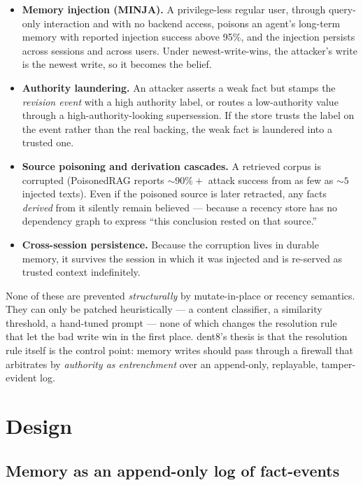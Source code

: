 \documentclass[11pt]{article}
\begin{document}
\begin{itemize}[leftmargin=*]
  \item \textbf{Memory injection (MINJA).} A privilege-less regular user, through query-only interaction and with no backend access, poisons an agent's long-term memory with reported injection success above 95\%, and the injection persists across sessions and across users. Under newest-write-wins, the attacker's write is the newest write, so it becomes the belief.
  \item \textbf{Authority laundering.} An attacker asserts a weak fact but stamps the \emph{revision event} with a high authority label, or routes a low-authority value through a high-authority-looking supersession. If the store trusts the label on the event rather than the real backing, the weak fact is laundered into a trusted one.
  \item \textbf{Source poisoning and derivation cascades.} A retrieved corpus is corrupted (PoisonedRAG reports ${\sim}90\%{+}$ attack success from as few as ${\sim}5$ injected texts). Even if the poisoned source is later retracted, any facts \emph{derived} from it silently remain believed --- because a recency store has no dependency graph to express ``this conclusion rested on that source.''
  \item \textbf{Cross-session persistence.} Because the corruption lives in durable memory, it survives the session in which it was injected and is re-served as trusted context indefinitely.
\end{itemize}

None of these are prevented \emph{structurally} by mutate-in-place or recency semantics. They can only be patched heuristically --- a content classifier, a similarity threshold, a hand-tuned prompt --- none of which changes the resolution rule that let the bad write win in the first place. dent8's thesis is that the resolution rule itself is the control point: memory writes should pass through a firewall that arbitrates by \emph{authority as entrenchment} over an append-only, replayable, tamper-evident log.

\section{Design}

\subsection{Memory as an append-only log of fact-events}
\end{document}
